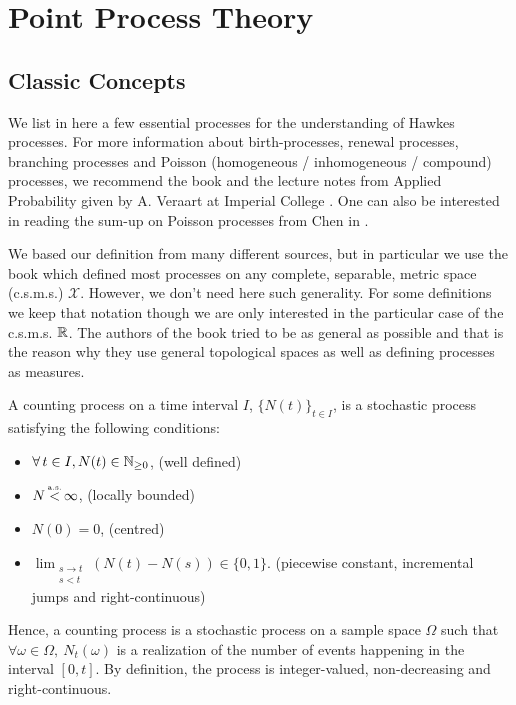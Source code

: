 \section{Point Process Theory}
\subsection{Classic Concepts}
We list in here a few essential processes for the understanding of Hawkes processes. For more information about birth-processes, renewal processes, branching processes and Poisson (homogeneous / inhomogeneous / compound) processes, we recommend the book \cite{Grimmett} and the lecture notes from Applied Probability given by A. Veraart at Imperial College \cite{Veraart}. One can also be interested in reading the sum-up on Poisson processes from Chen in \cite{simulchen}.

We based our definition from many different sources, but in particular we use the book \cite{daley} which defined most processes on any complete, separable, metric space (c.s.m.s.) $\mathcal X$. However, we don't need here such generality. For some definitions we keep that notation though we are only interested in the particular case of the c.s.m.s. $\mathbb{R}$. The authors of the book \cite{daley} tried to be as general as possible and that is the reason why they use general topological spaces as well as defining processes as measures. 

\begin{definition}
A counting process on a time interval $I$, $\{N(t)\}_{t \in I}$, is a stochastic process satisfying the following conditions: 
\begin{itemize}
\item $ \forall t \in I, N(t) \in \N $, (well defined)
\item  $N  \stackrel{\mathclap{\mbox{\normalfont\tiny a.s.}}}{<} \infty$, (locally bounded)
\item $ N(0) = 0$, (centred)
\item $ \lim_{ \substack{ s \to t \\ s < t}  } \left ( N(t) - N(s) \right ) \in \{0,1\}$. (piecewise constant, incremental jumps and right-continuous)
\end{itemize}
\end{definition}

Hence, a counting process is a stochastic process on a sample space $\Omega$ such that $ \forall \omega \in \Omega, \ N_t( \omega ) $ is a realization of the number of events happening in the interval $ [ 0,t ]$. By definition, the process is integer-valued, non-decreasing and right-continuous. 



